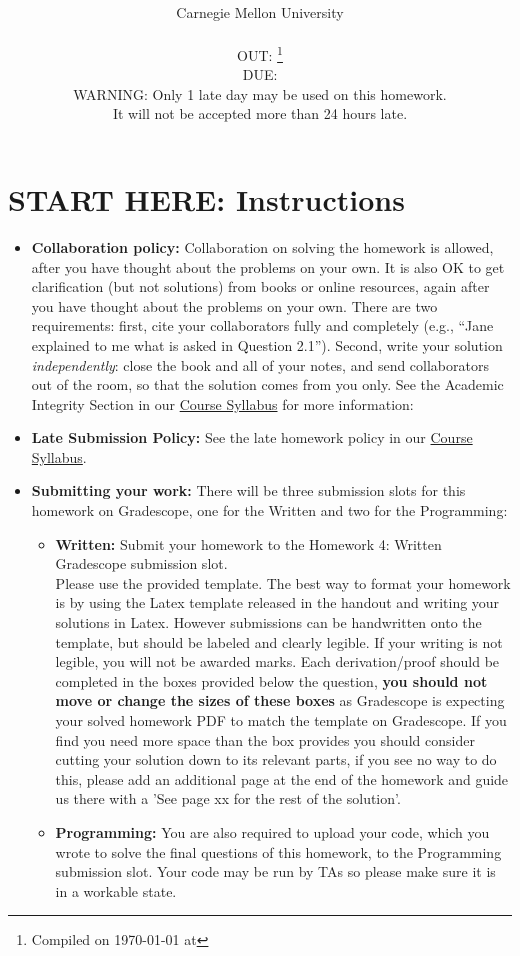 \documentclass{article}
\title{\textsc{\hwName}} %
\author{\courseName\\
  Carnegie Mellon University \\
\currentpiazza \\
OUT: \outDate{}\thanks{Compiled on \today{} at \currenttime{}} \\
DUE: \dueDate{} \\
WARNING: Only 1 late day may be used on this homework. \\ It will not be accepted more than 24 hours late.
}
\date{}
\date{}
\numberwithin{equation}{section} %
\numberwithin{figure}{section} %
\numberwithin{table}{section} %
\begin{document}
\maketitle

\section*{START HERE: Instructions}
\begin{itemize}
\item \textbf{Collaboration policy:} Collaboration on solving the homework is allowed, after you have thought about the problems on your own. It is also OK to get clarification (but not solutions) from books or online resources, again after you have thought about the problems on your own. There are two requirements: first, cite your collaborators fully and completely (e.g., ``Jane explained to me what is asked in Question 2.1''). Second, write your solution {\em independently}: close the book and all of your notes, and send collaborators out of the room, so that the solution comes from you only.  See the Academic Integrity Section in our \href{\currentsyllabus}{Course Syllabus} for more information:

\item\textbf{Late Submission Policy:} See the late homework policy in our \href{\currentsyllabus}{Course Syllabus}.

\item\textbf{Submitting your work:} There will be three submission slots for this homework on Gradescope, one for the Written and two for the Programming:

\begin{itemize}

\item \textbf{Written:} Submit your homework to the Homework 4: Written Gradescope submission slot. \\
Please use the provided template. The best way to format your homework is by using the Latex template released in the handout and writing your solutions in Latex. However submissions can be handwritten onto the template, but should be labeled and clearly legible. If your writing is not legible, you will not be awarded marks.  Each derivation/proof should be  completed in the boxes provided below the question, \textbf{you should not move or change the sizes of these boxes} as Gradescope is expecting your solved homework PDF to match the template on Gradescope. If you find you need more space than the box provides you should consider cutting your solution down to its relevant parts, if you see no way to do this, please add an additional page at the end of the homework and guide us there with a 'See page xx for the rest of the solution'.
\item \textbf{Programming:} You are also required to upload your code, which you wrote to solve the final questions of this homework, to the Programming submission slot. Your code may be run by TAs so please make sure it is in a workable state.


\end{itemize}
\end{itemize}
\end{document}
